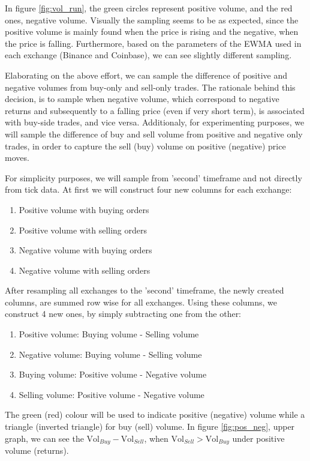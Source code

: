 In figure \ref{fig:vol_run}, the green circles represent positive volume, and the red ones, negative volume. Visually the sampling seems to be as expected, since the positive volume is mainly found when the price is rising and the negative, when the price is falling. Furthermore, based on the parameters of the EWMA used in each exchange (Binance and Coinbase), we can see slightly different sampling.

Elaborating on the above effort, we can sample the difference of positive and negative volumes from buy-only and sell-only trades. The rationale behind this decision, is to sample when negative volume, which correspond to negative returns and subsequently to a falling price (even if very short term), is associated with buy-side trades, and vice versa. Additionaly, for experimenting purposes, we will sample the difference of buy and sell volume from positive and negative only trades, in order to capture the sell (buy) volume on positive (negative) price moves.

For simplicity purposes, we will sample from 'second' timeframe and not directly from tick data. At first we will construct four new columns for each exchange:

\begin{enumerate}
\item Positive volume with buying orders
\item Positive volume with selling orders
\item Negative volume with buying orders
\item Negative volume with selling orders
\end{enumerate}

After resampling all exchanges to the 'second' timeframe, the newly created columns, are summed row wise for all exchanges. Using these columns, we construct 4 new ones, by simply subtracting one from the other:

\begin{enumerate}
\item Positive volume: Buying volume - Selling volume
\item Negative volume: Buying volume - Selling volume
\item Buying volume: Positive volume - Negative volume
\item Selling volume: Positive volume - Negative volume
\end{enumerate}

The green (red) colour will be used to indicate positive (negative) volume while a triangle (inverted triangle) for buy (sell) volume. In figure \ref{fig:pos_neg}, upper graph, we can see the \(\text{Vol}_{Buy} - \text{Vol}_{Sell} \), when \(\text{Vol}_{Sell} > \text{Vol}_{Buy} \) under positive volume (returns). 
 
